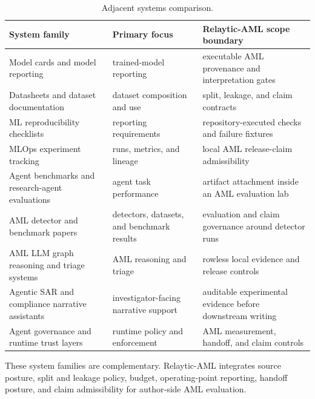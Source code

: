 \documentclass[11pt]{article}
\begin{document}
\begin{table}[H]
\centering
\caption{Adjacent systems comparison.}
\begin{minipage}{\linewidth}
\small
\setlength{\tabcolsep}{3pt}
\renewcommand{\arraystretch}{1.16}
\begin{tabularx}{\linewidth}{@{}>{\raggedright\arraybackslash}X >{\raggedright\arraybackslash}X >{\raggedright\arraybackslash}X@{}}
\toprule
System family & Primary focus & Relaytic-AML scope boundary \\
\midrule
Model cards and model reporting \citep{mitchell2019modelcards} & trained-model reporting & executable AML provenance and interpretation gates \\
Datasheets and dataset documentation \citep{gebru2021datasheets} & dataset composition and use & split, leakage, and claim contracts \\
ML reproducibility checklists \citep{pineau2021reproducibility} & reporting requirements & repository-executed checks and failure fixtures \\
MLOps experiment tracking \citep{zaharia2018mlflow} & runs, metrics, and lineage & local AML release-claim admissibility \\
Agent benchmarks and research-agent evaluations \citep{chen2025mlrbench,starace2025paperbench} & agent task performance & artifact attachment inside an AML evaluation lab \\
AML detector and benchmark papers \citep{weber2019elliptic,bellei2024elliptic2} & detectors, datasets, and benchmark results & evaluation and claim governance around detector runs \\
AML LLM graph reasoning and triage systems \citep{pirmorad2025amlgraphllm,naik2026llmopsaml} & AML reasoning and triage & rowless local evidence and release controls \\
Agentic SAR and compliance narrative assistants \citep{naik2025coinvestigator} & investigator-facing narrative support & auditable experimental evidence before downstream writing \\
Agent governance and runtime trust layers \citep{gaurav2025governanceaas,kaptein2026runtimegovernance} & runtime policy and enforcement & AML measurement, handoff, and claim controls \\
\bottomrule
\end{tabularx}
\end{minipage}
\end{table}


These system families are complementary. Relaytic-AML integrates source posture, split and leakage policy, budget, operating-point reporting, handoff posture, and claim admissibility for author-side AML evaluation.
\end{document}
